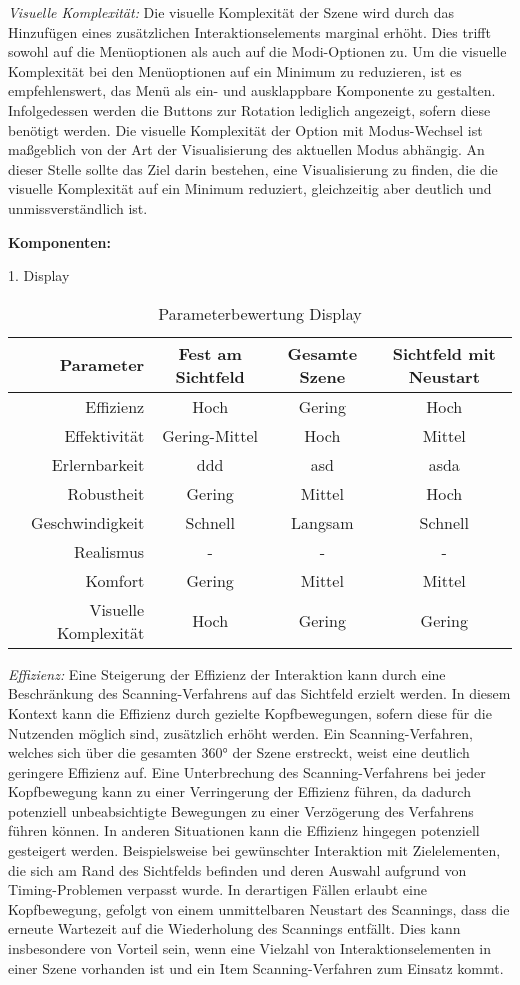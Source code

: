 \textit{Visuelle Komplexität:}
Die visuelle Komplexität der Szene wird durch das Hinzufügen eines zusätzlichen Interaktionselements marginal erhöht. Dies trifft sowohl auf die Menüoptionen als auch auf die Modi-Optionen zu. Um die visuelle Komplexität bei den Menüoptionen auf ein Minimum zu reduzieren, ist es empfehlenswert, das Menü als ein- und ausklappbare Komponente zu gestalten. Infolgedessen werden die Buttons zur Rotation lediglich angezeigt, sofern diese benötigt werden. Die visuelle Komplexität der Option mit Modus-Wechsel ist maßgeblich von der Art der Visualisierung des aktuellen Modus abhängig. An dieser Stelle sollte das Ziel darin bestehen, eine Visualisierung zu finden, die die visuelle Komplexität auf ein Minimum reduziert, gleichzeitig aber deutlich und unmissverständlich ist.

{\normalfont \bfseries Komponenten:} 

1. Display

\begin{table}[ht]
 \centering
 \begin{tabular}{r|c|c|c} 
 Parameter & Fest am Sichtfeld & Gesamte Szene & Sichtfeld mit Neustart \\
 \hline
 Effizienz & Hoch & Gering & Hoch \\
 Effektivität & Gering-Mittel & Hoch & Mittel\\
 Erlernbarkeit & ddd & asd & asda \\
 Robustheit & Gering & Mittel & Hoch\\
 Geschwindigkeit & Schnell & Langsam & Schnell\\
 Realismus & - & - & - \\
 Komfort & Gering & Mittel & Mittel\\ 
 Visuelle Komplexität & Hoch & Gering & Gering
 \end{tabular}
 \caption{Parameterbewertung Display}
 \label{tab:Display}
\end{table}

\textit{Effizienz:}
Eine Steigerung der Effizienz der Interaktion kann durch eine Beschränkung des Scanning-Verfahrens auf das Sichtfeld erzielt werden. In diesem Kontext kann die Effizienz durch gezielte Kopfbewegungen, sofern diese für die Nutzenden möglich sind, zusätzlich erhöht werden. Ein Scanning-Verfahren, welches sich über die gesamten 360° der Szene erstreckt, weist eine deutlich geringere Effizienz auf. Eine Unterbrechung des Scanning-Verfahrens bei jeder Kopfbewegung kann zu einer Verringerung der Effizienz führen, da dadurch potenziell unbeabsichtigte Bewegungen zu einer Verzögerung des Verfahrens führen können. In anderen Situationen kann die Effizienz hingegen potenziell gesteigert werden. Beispielsweise bei gewünschter Interaktion mit Zielelementen, die sich am Rand des Sichtfelds befinden und deren Auswahl aufgrund von Timing-Problemen verpasst wurde. In derartigen Fällen erlaubt eine Kopfbewegung, gefolgt von einem unmittelbaren Neustart des Scannings, dass die erneute Wartezeit auf die Wiederholung des Scannings entfällt. Dies kann insbesondere von Vorteil sein, wenn eine Vielzahl von Interaktionselementen in einer Szene vorhanden ist und ein Item Scanning-Verfahren zum Einsatz kommt.

